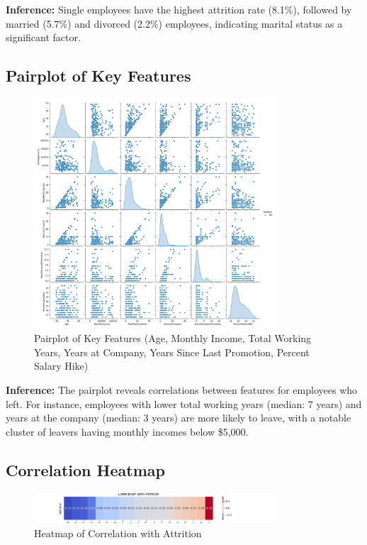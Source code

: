 \documentclass[12pt, a4paper]{article}
\begin{document}
\textbf{Inference:} Single employees have the highest attrition rate (8.1\%), followed by married (5.7\%) and divorced (2.2\%) employees, indicating marital status as a significant factor.

\subsection{Pairplot of Key Features}
\begin{figure}[H]
    \centering
    \includegraphics[width=0.8\textwidth]{plots/attrition_pairplot.png}
    \caption{Pairplot of Key Features (Age, Monthly Income, Total Working Years, Years at Company, Years Since Last Promotion, Percent Salary Hike)}
    \label{fig:attrition_pairplot}
\end{figure}

\textbf{Inference:} The pairplot reveals correlations between features for employees who left. For instance, employees with lower total working years (median: 7 years) and years at the company (median: 3 years) are more likely to leave, with a notable cluster of leavers having monthly incomes below \$5,000.

\subsection{Correlation Heatmap}
\begin{figure}[H]
    \centering
    \includegraphics[width=0.8\textwidth]{plots/attrition_correlation_heatmap.png}
    \caption{Heatmap of Correlation with Attrition}
    \label{fig:attrition_correlation}
\end{figure}
\end{document}

